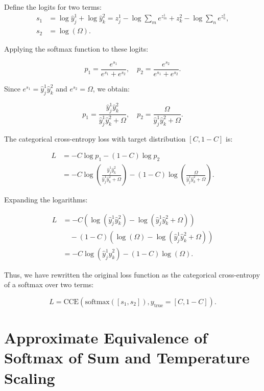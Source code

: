 \documentclass[twoside,11pt]{article}
\begin{document}
Define the logits for two terms:
\begin{align}
  \nonumber
  s_1 &= \log \hat{y}_j^1 + \log \hat{y}_k^2 = z_j^1 - \log \sum_m e^{z_m^1} + z_k^2 - \log \sum_n e^{z_n^2}, \\
  \nonumber
  s_2 &= \log (\Omega).
\end{align}

Applying the softmax function to these logits:

\[
p_1 = \frac{e^{s_1}}{e^{s_1} + e^{s_2}}, \quad p_2 = \frac{e^{s_2}}{e^{s_1} + e^{s_2}}.
\]

Since $e^{s_1} = \hat{y}_j^1 \hat{y}_k^2$ and $e^{s_2} = \Omega$, we obtain:

\[
p_1 = \frac{\hat{y}_j^1 \hat{y}_k^2}{\hat{y}_j^1 \hat{y}_k^2 + \Omega}, \quad
p_2 = \frac{\Omega}{\hat{y}_j^1 \hat{y}_k^2 + \Omega}.
\]

The categorical cross-entropy loss with target distribution $[C, 1 - C]$ is:

\begin{align}
  \nonumber
  L &= - C \log p_1 - (1 - C) \log p_2 \\
  \nonumber
  &= - C \log \left( \frac{\hat{y}_j^1 \hat{y}_k^2}{\hat{y}_j^1 \hat{y}_k^2 + \Omega} \right) 
        - (1 - C) \log \left( \frac{\Omega}{\hat{y}_j^1 \hat{y}_k^2 + \Omega} \right).
\end{align}

Expanding the logarithms:

\begin{align}
  \nonumber
  L &= - C \left( \log (\hat{y}_j^1 \hat{y}_k^2) - \log (\hat{y}_j^1 \hat{y}_k^2 + \Omega) \right) \\
    \nonumber
    &\quad - (1 - C) \left( \log (\Omega) - \log (\hat{y}_j^1 \hat{y}_k^2 + \Omega) \right) \\
    \nonumber
    &= - C \log (\hat{y}_j^1 \hat{y}_k^2) - (1 - C) \log (\Omega) .
  \end{align}


Thus, we have rewritten the original loss function as the categorical cross-entropy of a softmax over two terms:

\[
L = \text{CCE}(\text{softmax}([s_1, s_2]), y_{\text{true}}=[C, 1 - C]).
\]



\section{Approximate Equivalence of Softmax of Sum and Temperature Scaling}
\label{app:softmax-sum-temp}
\end{document}
